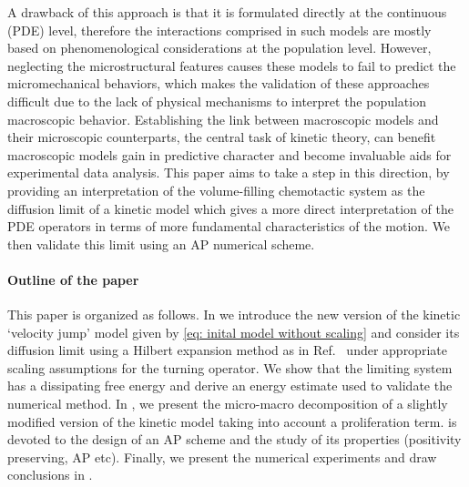 \documentclass[review,onefignum,onetabnum]{siamart220329}
\begin{document}
A drawback of this approach is that it is formulated directly at the continuous (PDE) level, therefore the interactions comprised in such models are mostly based on phenomenological considerations at the population level. However, neglecting the microstructural features causes these models to fail to predict the micromechanical behaviors, which makes the validation of these approaches {difficult} due to the lack of physical mechanisms to interpret the population macroscopic behavior. Establishing the link between macroscopic models and their microscopic counterparts, the central task of kinetic theory, can benefit macroscopic models gain in predictive character and become invaluable aids for experimental data analysis. {This paper aims to take a step in this direction, by providing an interpretation of the volume-filling chemotactic system as the diffusion limit of a kinetic {\color{red}{`velocity jump'}} model which gives a more direct interpretation of the PDE operators in terms of more fundamental characteristics of the motion.} {We then validate this limit using an AP numerical scheme.}

\paragraph{Outline of the paper} This paper is organized as follows. In  we {introduce the new version of the kinetic `velocity jump' model given by \cref{eq: inital model without scaling}} and consider its diffusion limit using a Hilbert expansion method as in Ref.~\cite{othmer2002diffusion} under appropriate scaling assumptions for the turning operator. We show that the limiting system has a dissipating free energy and derive an energy estimate used to validate the numerical method. {In , we present the micro-macro decomposition of a slightly modified version of the kinetic model taking into account a proliferation term.  is devoted to the design of an AP scheme and the study of its properties (positivity preserving, AP etc). Finally, we present the numerical experiments and draw conclusions in }. 
\end{document}
